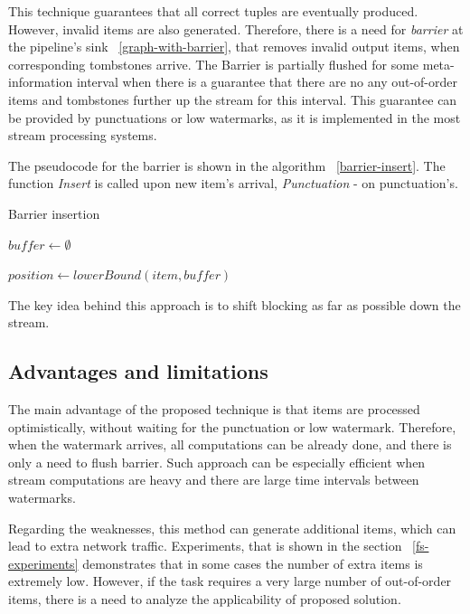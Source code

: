 This technique guarantees that all correct tuples are eventually produced. However, invalid items are also generated. Therefore, there is a need for {\it barrier} at the pipeline's sink ~\ref{graph-with-barrier}, that removes invalid output items, when corresponding tombstones arrive. The Barrier is partially flushed for some meta-information interval when there is a guarantee that there are no any out-of-order items and tombstones further up the stream for this interval. This guarantee can be provided by punctuations or low watermarks, as it is implemented in the most stream processing systems. 

The pseudocode for the barrier is shown in the algorithm  ~\ref{barrier-insert}. The function {\it Insert} is called upon new item's arrival, {\it Punctuation} - on punctuation's.

\begin{algorithm*}
\caption{Barrier insertion}
\label{barrier-insert}
  \begin{algorithmic}[1]
    \State $buffer \gets \emptyset$

      \State $position \gets lowerBound(item, buffer)$
        \State {}
      \Else
        \State {}
      \EndIf
    \EndFunction

    \item[]

        \State {}
        \State {}
      \EndFor
    \EndFunction
  \end{algorithmic}
\end{algorithm*}

The key idea behind this approach is to shift blocking as far as possible down the stream.

\subsection{Advantages and limitations}
The main advantage of the proposed technique is that items are processed optimistically, without waiting for the punctuation or low watermark. Therefore, when the watermark arrives, all computations can be already done, and there is only a need to flush barrier. Such approach can be especially efficient when stream computations are heavy and there are large time intervals between watermarks.

Regarding the weaknesses, this method can generate additional items, which can lead to extra network traffic. Experiments, that is shown in the section ~\ref{fs-experiments} demonstrates that in some cases the number of extra items is extremely low. However, if the task requires a very large number of out-of-order items, there is a need to analyze the applicability of proposed solution.


